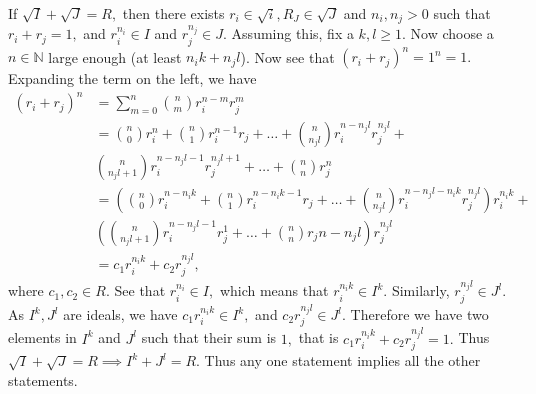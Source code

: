 \documentclass{article}
\begin{document}
\begin{enumerate}
	If $\sqrt{I}+\sqrt{J}=R,$ then there exists $r_i \in \sqrt{i}, R_J \in \sqrt{J}$ and $n_i,n_j >0$ such that $r_i+r_j=1,$ and $r_i^{n_i} \in I$ and $r_j^{n_j}\in J.$
	Assuming this, fix a $k,l \geq 1.$ Now choose a $n \in \mathbb{N}$ large enough (at least $n_ik+n_jl$). Now see that $(r_i+r_j)^{n}=1^n=1.$
	Expanding the term on the left, we have 
	\begin{align*}
		(r_i+r_j)^{n} &= \sum_{m=0}^n \binom{n}{m} r_i^{n-m}r_j^m\\ 
		&= \binom{n}{0}r_i^n+\binom{n}{1}r_i^{n-1}r_j + \dots + \binom{n}{n_jl}r_i^{n-n_jl}r_j^{n_jl} + \\
		&\binom{n}{n_jl+1}r_i^{n-n_jl-1}r_j^{n_jl+1}+\dots+\binom{n}{n}r_j^n\\
		&= \left(\binom{n}{0}r_i^{n-n_ik}+\binom{n}{1}r_i^{n-n_ik-1}r_j + \dots + \binom{n}{n_jl}r_i^{n-n_jl-n_ik}r_j^{n_jl} \right)r_i^{n_ik}+ \\
		&\left(\binom{n}{n_jl+1}r_i^{n-n_jl-1}r_j^{1}+\dots+\binom{n}{n}r_j{n-n_jl}\right)r_j^{n_jl}\\
		&= c_1r_i^{n_ik}+c_2r_j^{n_jl},
	\end{align*}
	where $c_1,c_2 \in R.$ See that $r_i^{n_i} \in I,$ which means that $ r_i^{n_ik} \in I^k.$ Similarly, $r_j^{n_jl} \in J^l.$ As $I^k, J^l$ are ideals,
	we have $ c_1r_i^{n_ik} \in I^k,$ and  $c_2r_j^{n_jl} \in J^l.$ Therefore we have two elements in $I^k$ and $J^l$ such that their sum is $1,$ that is 
	 $c_1r_i^{n_ik}+c_2r_j^{n_jl}=1.$ Thus $\sqrt{I}+\sqrt{J}=R \implies I^k+J^l=R.$ Thus any one statement implies all the other statements. 
\end{enumerate}
\section{} %
\end{document}
